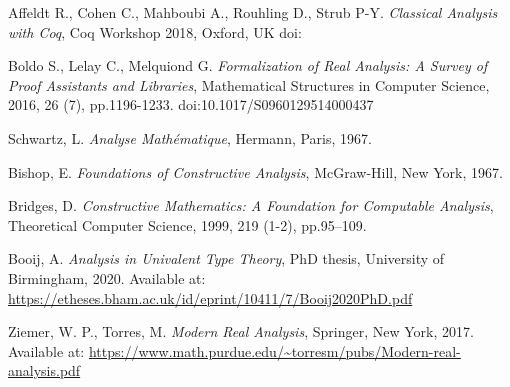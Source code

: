 \documentclass{article}
\begin{document}
\begin{thebibliography}{999}

 Affeldt R., Cohen C., Mahboubi A., Rouhling D.,  Strub P-Y. \emph{Classical Analysis with Coq},
Coq Workshop 2018, Oxford, UK doi:

 Boldo S., Lelay C., Melquiond G. \emph{Formalization of Real Analysis: A Survey of Proof Assistants and Libraries},
Mathematical Structures in Computer Science, 2016, 26 (7), pp.1196-1233. doi:10.1017/S0960129514000437

 Schwartz, L. \emph{Analyse Mathématique}, Hermann, Paris, 1967.

 Bishop, E. \emph{Foundations of Constructive Analysis}, McGraw-Hill, New York, 1967.

 Bridges, D. \emph{Constructive Mathematics: A Foundation for Computable Analysis}, Theoretical Computer Science, 1999, 219 (1-2), pp.95--109.

 Booij, A. \emph{Analysis in Univalent Type Theory}, PhD thesis, University of Birmingham, 2020. Available at: \url{https://etheses.bham.ac.uk/id/eprint/10411/7/Booij2020PhD.pdf}

 Ziemer, W. P., Torres, M. \emph{Modern Real Analysis}, Springer, New York, 2017. Available at: \url{https://www.math.purdue.edu/~torresm/pubs/Modern-real-analysis.pdf}

\end{thebibliography}
\end{document}
